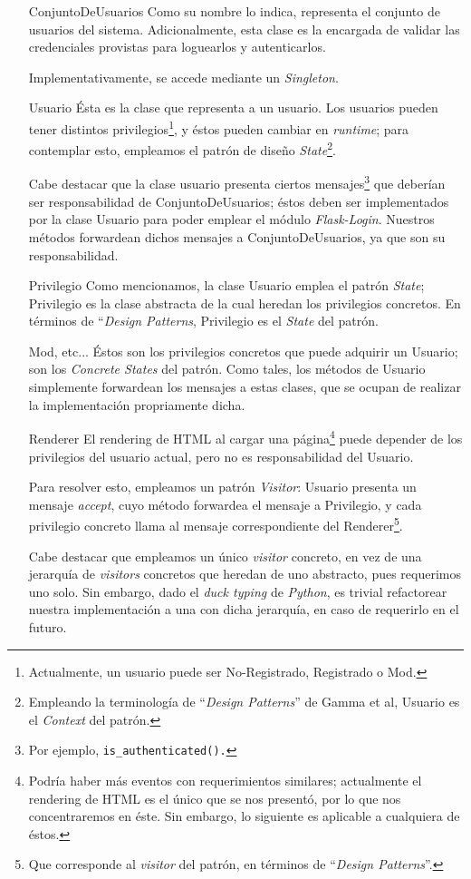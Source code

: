 \begin{itemize}
\item[ConjuntoDeUsuarios] Como su nombre lo indica, representa el conjunto de usuarios del sistema. Adicionalmente, esta clase es la encargada de validar las credenciales provistas para loguearlos y autenticarlos.
    \par Implementativamente, se accede mediante un \textit{Singleton}.
\item[Usuario] Ésta es la clase que representa a un usuario. 
    Los usuarios pueden tener distintos privilegios\footnote{Actualmente, un usuario puede ser No-Registrado, Registrado o Mod.}, y éstos pueden cambiar en \textit{runtime}; para contemplar esto, empleamos el patrón de diseño \textit{State}\footnote{Empleando la terminología de ``\textit{Design Patterns}'' de Gamma et al, Usuario es el \textit{Context} del patrón.}.
        \par Cabe destacar que la clase usuario presenta ciertos mensajes\footnote{Por ejemplo, \tt{is\_authenticated()}.} que deberían ser responsabilidad de ConjuntoDeUsuarios; éstos deben ser implementados por la clase Usuario para poder emplear el módulo \textit{Flask-Login}.
        Nuestros métodos forwardean dichos mensajes a ConjuntoDeUsuarios, ya que son su responsabilidad.
    \item[Privilegio] Como mencionamos, la clase Usuario emplea el patrón \textit{State}; Privilegio es la clase abstracta de la cual heredan los privilegios concretos. En términos de ``\textit{Design Patterns}, Privilegio es el \textit{State} del patrón.
    \item[Mod, etc...] Éstos son los privilegios concretos que puede adquirir un Usuario; son los \textit{Concrete States} del patrón. Como tales, los métodos de Usuario simplemente forwardean los mensajes a estas clases, que se ocupan de realizar la implementación propriamente dicha.
    \item[Renderer] El rendering de HTML al cargar una página\footnote{Podría haber más eventos con requerimientos similares; actualmente el rendering de HTML es el único que se nos presentó, por lo que nos concentraremos en éste. Sin embargo, lo siguiente es aplicable a cualquiera de éstos.} puede depender de los privilegios del usuario actual, pero no es responsabilidad del Usuario.
        \par Para resolver esto, empleamos un patrón \textit{Visitor}: Usuario presenta un mensaje \textit{accept}, cuyo método forwardea el mensaje a Privilegio, y cada privilegio concreto llama al mensaje correspondiente del Renderer\footnote{Que corresponde al \textit{visitor} del patrón, en términos de ``\textit{Design Patterns}''.}.
    \par Cabe destacar que empleamos un único \textit{visitor} concreto, en vez de una jerarquía de \textit{visitors} concretos que heredan de uno abstracto, pues requerimos uno solo. Sin embargo, dado el \textit{duck typing} de \textit{Python}, es trivial refactorear nuestra implementación a una con dicha jerarquía, en caso de requerirlo en el futuro.
\end{itemize}



